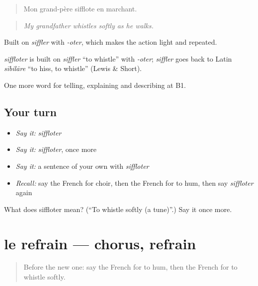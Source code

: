 \begin{quote}
Mon grand-père sifflote en marchant.
\end{quote}

\begin{quote}
\emph{My grandfather whistles softly as he walks.}
\end{quote}

Built on \emph{siffler} with \emph{-oter}, which makes the action light and repeated.

\begin{cousinweb}
\emph{siffloter} is built on \emph{siffler} \textquotedblleft{}to whistle\textquotedblright{} with \emph{-oter}; \emph{siffler} goes back to Latin \emph{sībilāre} \textquotedblleft{}to hiss, to whistle\textquotedblright{} (Lewis \& Short).
\end{cousinweb}

\begin{grammarlens}[title={What you've built}]
One more word for telling, explaining and describing at B1.
\end{grammarlens}

\subsection*{Your turn}
\begin{itemize}
\raggedright
  \item \emph{Say it:} \emph{siffloter}
  \item \emph{Say it:} \emph{siffloter}, once more
  \item \emph{Say it:} a sentence of your own with \emph{siffloter}
  \item \emph{Recall:} say the French for choir, then the French for to hum, then say \emph{siffloter} again
\end{itemize}

\begin{tcolorbox}[breakable,colback=teal!4,colframe=teal!35!black,title={Before you move on}]
What does siffloter mean? (\textquotedblleft{}To whistle softly (a tune)\textquotedblright{}.) Say it once more.
\end{tcolorbox}
\section[le refrain]{le refrain — chorus, refrain}

\label{lesson:FR-C512-refrain}



\begin{quote}
Before the new one: say the French for to hum, then the French for to whistle softly.
\end{quote}

